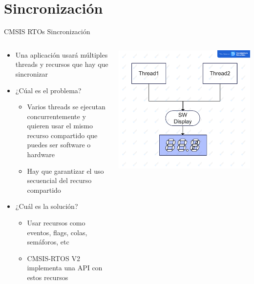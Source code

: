 \section{Sincronización}
\begin{frame}{CMSIS RTOs Sincronización}
    \begin{columns}
        \begin{column}{0.50\textwidth}
            \begin{itemize}
                \item Una aplicación usará múltiples threads y recursos que hay que sincronizar
                \item ¿Cúal es el problema?
                    \begin{itemize}
                        \item Varios threads se ejecutan concurrentemente y quieren usar el mismo recurso compartido que puedes ser software o hardware
                        \item Hay que garantizar el uso secuencial del recurso compartido
                    \end{itemize}
                \item ¿Cuál es la solución?
                \begin{itemize}
                    \item Usar recursos como eventos, flags, colas, semáforos, etc
                    \item CMSIS-RTOS V2 implementa una API con estos recursos
                \end{itemize}
            \end{itemize}    
        \end{column}
        \begin{column}{0.50\textwidth}
            \includegraphics[scale=0.05]{presentation/threads.jpg}
        \end{column}
    \end{columns}
\end{frame}
